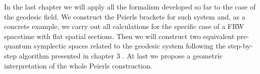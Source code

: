 \documentclass[Main]{subfiles}
\begin{document}
In the last chapter we will apply all the formalism developed so far to the case of the geodesic field.
We construct the Peierls brackets for such system and, as a  concrete example, we carry out all calculations for the specific case of a FRW spacetime with flat spatial sections.
Then we will construct two equivalent pre-quantum symplectic spaces related to the geodesic system following the step-by-step algorithm presented in chapter 3 .
At last we propose a geometric interpretation of the whole Peierls construction.
\end{document}
